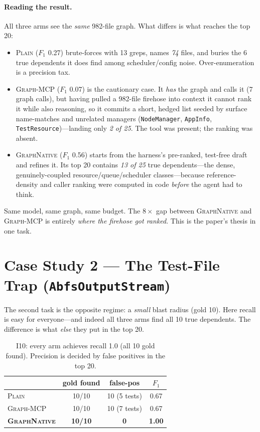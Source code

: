 \documentclass[11pt,twocolumn]{article}
\newcommand{\best}[1]{\textbf{#1}}
\newcommand{\gn}{{\normalfont\scshape GraphNative}}
\newcommand{\mcp}{{\normalfont\scshape Graph-MCP}}
\newcommand{\plain}{{\normalfont\scshape Plain}}
\begin{document}
\paragraph{Reading the result.} All three arms see the \emph{same} 982-file graph. What differs is
what reaches the top 20:
\begin{itemize}
  \item \plain{} (\textcolor{bad}{$F_1$ 0.27}) brute-forces with 13 greps, names \emph{74} files, and
  buries the 6 true dependents it does find among scheduler/config noise. Over-enumeration is a
  precision tax.
  \item \mcp{} (\textcolor{bad}{$F_1$ 0.07}) is the cautionary case. It \emph{has} the graph and
  calls it (7 graph calls), but having pulled a 982-file firehose into context it cannot rank it
  while also reasoning, so it commits a short, hedged list seeded by surface name-matches and
  unrelated managers (\texttt{NodeManager}, \texttt{AppInfo}, \texttt{TestResource})---landing only
  \emph{2 of 25}. The tool was present; the ranking was absent.
  \item \gn{} (\textcolor{win}{$F_1$ 0.56}) starts from the harness's pre-ranked, test-free draft and
  refines it. Its top 20 contains \emph{13 of 25} true dependents---the dense, genuinely-coupled
  resource/queue/scheduler classes---because reference-density and caller ranking were computed in
  code \emph{before} the agent had to think.
\end{itemize}
Same model, same graph, same budget. The $8\times$ gap between \gn{} and \mcp{} is entirely
\emph{where the firehose got ranked}. This is the paper's thesis in one task.

\section{Case Study 2 --- The Test-File Trap (\texttt{AbfsOutputStream})}

The second task is the opposite regime: a \emph{small} blast radius (gold 10). Here recall is easy
for everyone---and indeed all three arms find all 10 true dependents. The difference is what
\emph{else} they put in the top 20.

\begin{table}[h]\centering\footnotesize
\setlength{\tabcolsep}{5pt}
\renewcommand{\arraystretch}{1.1}
\caption{I10: every arm achieves recall 1.0 (all 10 gold found). Precision is decided by false
positives in the top 20.}\label{tab:i10}
\begin{tabular}{lccc}
\toprule
 & gold found & false-pos & $F_1$ \\
\midrule
\plain{}        & 10/10 & 10 (5 tests) & 0.67 \\
\mcp{}          & 10/10 & 10 (7 tests) & 0.67 \\
\best{\gn{}}    & \best{10/10} & \best{0} & \best{1.00} \\
\bottomrule
\end{tabular}
\end{table}
\end{document}
